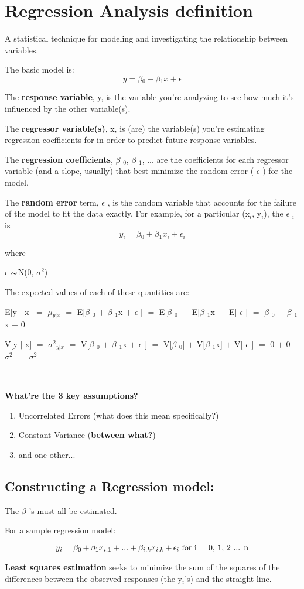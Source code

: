 \documentclass{article}
\newcommand{\mt}[1]{\ensuremath{#1}}
\newcommand\bsc[2][\DefaultOpt]{%
  \def\DefaultOpt{#2}%
  \section[#1]{#2}%
}
\newcommand\ssc[2][\DefaultOpt]{%
  \def\DefaultOpt{#2}%
  \subsection[#1]{#2}%
}
\newcommand{\balist}{\begin{enumerate}[label=\alph*.]}
\newcommand{\elist}{\end{enumerate}}
\newcommand{\ep}{\mt{\epsilon} }         %
\newcommand{\bta}{\mt{\beta} }
\newcommand{\ps}{\mt{\operatorname{+}} }
\newcommand{\eql}{ \mt{\operatorname{=}} }
\newcommand{\uw}[2]{#1\mt{_{#2}}}
\newcommand{\eqn}[1]{\[#1\]}
\newcommand{\txt}[1]{\text{#1}} %
\newcommand{\tl}{\mt{\thicksim}}
\newcommand{\ssq}{\mt{\sigma^2}}
\newcommand{\exv}[1]{E[#1]}
\newcommand{\vrn}[1]{V[#1]}
\newcommand{\gv}{ \mt{|} }
\begin{document}
\bsc{Regression Analysis definition}{A statistical technique for modeling and investigating the relationship between variables.}

The basic model is:
\eqn{y \eql \uw{\bta}{0} \ps \uw{\bta}{1}x \ps \ep}

The \textbf{response variable}, y, is the variable you're analyzing to see how much it's influenced by the other variable(s).

The \textbf{regressor variable(s)}, x, is (are) the variable(s) you're estimating regression coefficients for in order to predict future response variables.

The \textbf{regression coefficients}, \uw{\bta}{0}, \uw{\bta}{1}, ... are the coefficients for each regressor variable (and a slope, usually) that best minimize the random error ( \ep) for the model.

The \textbf{random error} term, \ep, is the random variable that accounts for the failure of the model to fit the data exactly. For example, for a particular (\uw{x}{i}, \uw{y}{i}), the \uw{\ep}{i} is
\eqn{\uw{y}{i} \eql \uw{\bta}{0} \ps \uw{\bta}{1}\uw{x}{i} \ps \uw{\ep}{i}}

where

\ep \tl N(0, \ssq)

The expected values of each of these quantities are:



\exv{y\gv x} \eql \uw{\mt{\mu}}{y\gv x} \eql \exv{\uw{\bta}{0} \ps \uw{\bta}{1}x \ps \ep} \eql \exv{\uw{\bta}{0}} + \exv{\uw{\bta}{1}x} + \exv{ \ep} \eql \uw{\bta}{0} \ps \uw{\bta}{1}x \ps 0

\vrn{y\gv x} \eql \uw{\ssq}{y\gv x} \eql \vrn{\uw{\bta}{0} \ps \uw{\bta}{1}x \ps \ep} \eql \vrn{\uw{\bta}{0}} \ps \vrn{\uw{\bta}{1}x} \ps \vrn{ \ep} \eql 0 \ps 0 \ps \ssq \eql \ssq \

\

\textbf{What're the 3 key assumptions?}

\balist
\item Uncorrelated Errors (what does this mean specifically?)
\item Constant Variance (\textbf{between what?})
\item and one other...
\elist

\newpage 
\ssc{Constructing a Regression model:}{
The \bta's must all be estimated.

For a sample regression model:

\eqn{\uw{y}{i} = \uw{\beta}{0} \ps \uw{\bta}{1}\uw{x}{i, 1} + ... + \uw{\bta}{i, k}\uw{x}{i, k} \ps \uw{\ep}{i} \txt{   for i \eql 0, 1, 2 ... n}}

\textbf{Least squares estimation} seeks to minimize the sum of the squares of the differences between the observed responses (the \uw{y}{i}'s) and the straight line.
}
\end{document}
